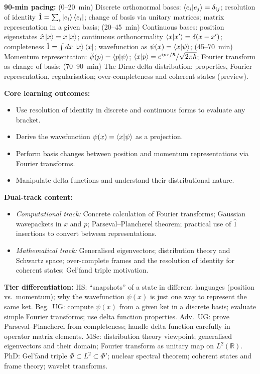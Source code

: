 \documentclass[11pt,a4paper]{article}
\begin{document}
\medskip
\begin{tcolorbox}[modulebox, title={Module~I.3 --- Lecture L02: Bases: Discrete and Continuous}]
\textbf{90-min pacing:} (0--20~min) Discrete orthonormal bases: $\braket{e_i|e_j}=\delta_{ij}$;
resolution of identity $\hat{1}=\sum_i\ket{e_i}\bra{e_i}$;
change of basis via unitary matrices; matrix representation in a given basis;
(20--45~min) Continuous bases: position eigenstates $\hat{x}\ket{x}=x\ket{x}$;
continuous orthonormality $\braket{x|x'}=\delta(x-x')$; completeness
$\hat{1}=\int dx\,\ket{x}\bra{x}$; wavefunction as $\psi(x)=\braket{x|\psi}$;
(45--70~min) Momentum representation: $\tilde{\psi}(p)=\braket{p|\psi}$;
$\braket{x|p}=e^{ipx/\hbar}/\sqrt{2\pi\hbar}$; Fourier transform as change of basis;
(70--90~min) The Dirac delta distribution: properties, Fourier representation,
regularisation; over-completeness and coherent states (preview).

\medskip\textbf{Core learning outcomes:}
\begin{itemize}[leftmargin=1.4em,topsep=2pt,itemsep=1pt]
  \item Use resolution of identity in discrete and continuous forms to evaluate any bracket.
  \item Derive the wavefunction $\psi(x)=\braket{x|\psi}$ as a projection.
  \item Perform basis changes between position and momentum representations via Fourier transforms.
  \item Manipulate delta functions and understand their distributional nature.
\end{itemize}

\medskip\textbf{Dual-track content:}
\begin{itemize}[leftmargin=1.4em,topsep=2pt,itemsep=1pt]
  \item \textit{Computational track:} Concrete calculation of Fourier transforms;
    Gaussian wavepackets in $x$ and $p$; Parseval--Plancherel theorem;
    practical use of $\hat{1}$ insertions to convert between representations.
  \item \textit{Mathematical track:} Generalised eigenvectors; distribution theory
    and Schwartz space; over-complete frames and the resolution of identity for
    coherent states; Gel'fand triple motivation.
\end{itemize}

\medskip\textbf{Tier differentiation:}
HS: ``snapshots'' of a state in different languages (position vs.\ momentum);
why the wavefunction $\psi(x)$ is just one way to represent the same ket.
Beg.\ UG: compute $\psi(x)$ from a given ket in a discrete basis; evaluate simple
Fourier transforms; use delta function properties.
Adv.\ UG: prove Parseval--Plancherel from completeness; handle delta function
carefully in operator matrix elements.
MSc: distribution theory viewpoint; generalised eigenvectors and their domain;
Fourier transform as unitary map on $L^2(\mathbb{R})$.
PhD: Gel'fand triple $\Phi\subset L^2\subset\Phi'$; nuclear spectral theorem;
coherent states and frame theory; wavelet transforms.


\end{tcolorbox}
\end{document}
